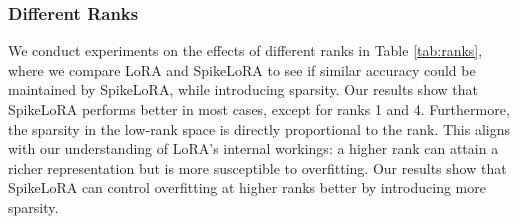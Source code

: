 \documentclass{article} %
\begin{document}
\subsubsection{Different Ranks}
\label{ranks}
We conduct experiments on the effects of different ranks in Table \ref{tab:ranks}, where we compare LoRA and SpikeLoRA to see if similar accuracy could be maintained by SpikeLoRA, while introducing sparsity. Our results show that SpikeLoRA performs better in most cases, except for ranks 1 and 4. Furthermore, the sparsity in the low-rank space is directly proportional to the rank. This aligns with our understanding of LoRA's internal workings: a higher rank can attain a richer representation but is more susceptible to overfitting. Our results show that SpikeLoRA can control overfitting at higher ranks better by introducing more sparsity.

\begin{table}[htbp]
  \centering
  \caption{Matthew's correlation coefficient (MCC) and sparsity (\%) when fine-tuning on the CoLA dataset using different ranks for LoRA and SpikeLoRA. The third row shows the generalisation gap, indicating the difference between evaluation and training loss (lower is better). Subscripts indicate SpikeLoRA's performance relative to LoRA.}
  \label{tab:ranks}
\end{table}
\end{document}
